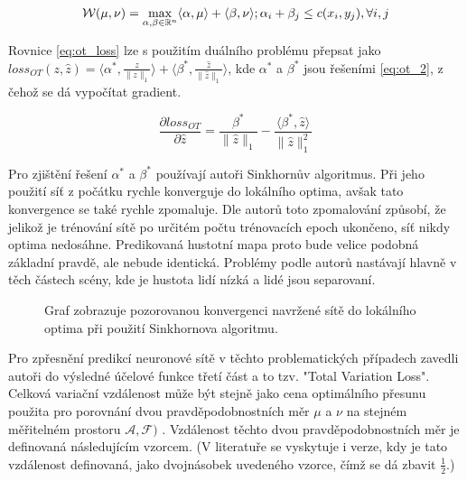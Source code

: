 \begin{equation}
\mathcal{W}(\mu, \nu) = \max_{\alpha, \beta \in \mathbb{R}^n} \langle \alpha, \mu \rangle + \langle \beta, \nu \rangle; \alpha_i + \beta_j  \leq c(x_i, y_j),  \forall i, j
\label{eq:ot_2}
\end{equation}

Rovnice \ref{eq:ot_loss} lze s použitím duálního problému přepsat jako \( loss_{OT}(z, \hat{z}) = \bigg \langle \alpha^*, \frac{z}{\|z\|_1} \bigg \rangle + \bigg \langle \beta^*, \frac{\hat{z}}{\|\hat{z}\|_1} \bigg \rangle \), kde  \(\alpha^*\) a \(\beta^*\) jsou řešeními \ref{eq:ot_2}, z čehož se dá vypočítat gradient.

\begin{equation}
\frac{\partial loss_{OT}}{\partial \hat{z}} = \frac{\beta^*}{\|\hat{z}\|_1} - \frac{ \langle \beta^*, \hat{z} \rangle}{\|\hat{z}\|_1^2}
\label{eq:ot_2}
\end{equation}

Pro zjištění řešení \(\alpha^*\) a \(\beta^*\) používají autoři Sinkhornův algoritmus.
Při jeho použití síť z počátku rychle konverguje do lokálního optima, avšak tato konvergence se také rychle zpomaluje.
Dle autorů toto zpomalování způsobí, že jelikož je trénování sítě po určitém počtu trénovacích epoch ukončeno, síť nikdy optima nedosáhne.
Predikovaná hustotní mapa proto bude velice podobná základní pravdě, ale nebude identická.
Problémy podle autorů nastávají hlavně v těch částech scény, kde je hustota lidí nízká a lidé jsou separovaní.

\begin{figure}[h!]
	\centering
	
	\caption{Graf zobrazuje pozorovanou konvergenci navržené sítě do lokálního optima při použití Sinkhornova algoritmu.}
	\label{fig:RNN_architecture}
\end{figure}

Pro zpřesnění predikcí neuronové sítě v těchto problematických případech zavedli autoři do výsledné účelové funkce třetí část a to tzv. "Total Variation Loss".
Celková variační vzdálenost může být stejně jako cena optimálního přesunu použita pro porovnání dvou pravděpodobnostních měr \(\mu\) a \(\nu\) na stejném měřitelném prostoru \(\mathcal{A}, \mathcal{F})\) \cite{Total_variation}.
Vzdálenost těchto dvou pravděpodobnostních měr je definovaná následujícím vzorcem. (V literatuře se vyskytuje i verze, kdy je tato vzdálenost definovaná, jako dvojnásobek uvedeného vzorce, čímž se dá zbavit \(\frac{1}{2}\).)

